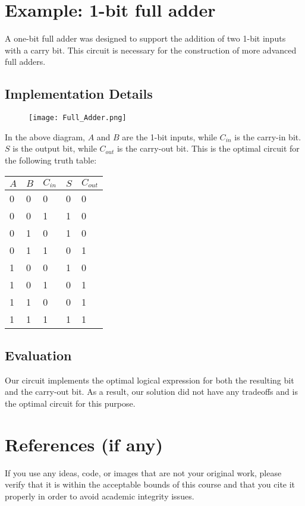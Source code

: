 \documentclass[11pt]{article}
\begin{document}
\section{Example: 1-bit full adder}
	A one-bit full adder was designed to support the addition of two 1-bit inputs with a carry bit. This circuit is necessary for the construction of more advanced full adders.

	\subsection{Implementation Details}

	\begin{figure}[htp]
		\centering
		\texttt{[image: Full\_Adder.png]}
	\end{figure}

	In the above diagram, $A$ and $B$ are the 1-bit inputs, while
        $C_{in}$ is the carry-in bit. $S$ is the output bit, while
        $C_{out}$ is the carry-out bit. This is the optimal
        circuit for the following truth table: \\

	
	\begin{tabular}{|l|l|l|l|l|}
	\hline
		$A$ & $B$ & $C_{in}$ & $S$ & $C_{out}$ \\
			\hline
		0 & 0 & 0 & 0 & 0 \\
			\hline
		0 & 0 & 1 & 1 & 0 \\
			\hline
		0 & 1 & 0 & 1 & 0 \\
			\hline
		0 & 1 & 1 & 0 & 1 \\
			\hline
		1 & 0 & 0 & 1 & 0 \\
			\hline
		1 & 0 & 1 & 0 & 1 \\
			\hline
		1 & 1 & 0 & 0 & 1 \\
			\hline
		1 & 1 & 1 & 1 & 1 \\
	\hline
	\end{tabular}
	
	\subsection{Evaluation}
	Our circuit implements the optimal logical expression for both
        the resulting bit and the carry-out bit. As a result, our
        solution did not have any tradeoffs and is the optimal circuit
        for this purpose.


\section{References (if any)}
If you use any ideas, code, or images that are not your original work,
please verify that it is within the acceptable bounds of this course
and that you cite it properly in order to avoid academic integrity
issues.
\end{document}
